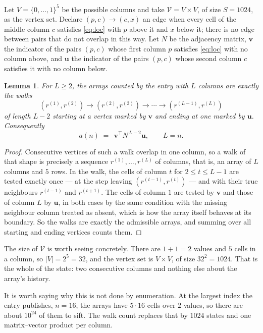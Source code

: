 \documentclass[11pt,a4paper]{article}
\theoremstyle{plain}
\newtheorem{lemma}[theorem]{Lemma}
\theoremstyle{definition}
\begin{document}
Let $V=\{0,\dots,1\}^{5}$ be the possible columns and take
$\mathcal V=V\times V$, of size $S=1024$, as the vertex set. Declare $(p,c)\to(c,x)$ an edge
when every cell of the middle column $c$ satisfies \eqref{eq:loc} with $p$ above it and $x$
below it; there is no edge between pairs that do not overlap in this way. Let $N$ be the
adjacency matrix, $\mathbf{v}$ the indicator of the pairs $(p,c)$ whose first column $p$
satisfies \eqref{eq:loc} with no column above, and $\mathbf{u}$ the indicator of
the pairs $(p,c)$ whose second column $c$ satisfies it with no column below.

\begin{lemma}\label{lem:walk}
For $L\ge2$, the arrays counted by the entry with $L$ columns are exactly the walks
\[
(r^{(1)},r^{(2)})\to(r^{(2)},r^{(3)})\to\cdots\to(r^{(L-1)},r^{(L)})
\]
of length $L-2$ starting at a vertex marked by $\mathbf{v}$ and ending at one marked by
$\mathbf{u}$. Consequently
\[
a(n)\;=\;\,\mathbf{v}^{\!\top}N^{\,L-2}\mathbf{u},\qquad L=n .
\]
\end{lemma}

\begin{proof}
Consecutive vertices of such a walk overlap in one column, so a walk of that shape is
precisely a sequence $r^{(1)},\dots,r^{(L)}$ of columns, that is, an array of $L$ columns
and $5$ rows. In the walk, the cells of column $t$ for $2\le t\le L-1$ are tested
exactly once --- at the step leaving $(r^{(t-1)},r^{(t)})$ --- and with their true
neighbours $r^{(t-1)}$ and $r^{(t+1)}$. The cells of column $1$ are tested by
$\mathbf{v}$ and those of column $L$ by $\mathbf{u}$, in both cases by the same condition
with the missing neighbour column treated as absent, which is how the array itself behaves at
its boundary. So the walks are exactly the admissible arrays, and summing over all starting
and ending vertices counts them.
\end{proof}


The size of $\mathcal V$ is worth seeing concretely. There are $1+1=2$ values
and $5$ cells in a column, so $|V|=2^{5}=32$, and the vertex set is
$V\times V$, of size $32^2=1024$. That is the whole of the state: two consecutive
columns and nothing else about the array's history.

It is worth saying why this is not done by enumeration. At the largest index the entry
publishes, $n=16$, the arrays have $5\cdot16$ cells over
$2$ values, so there are about $10^{24}$ of them to sift. The
walk count replaces that by $1024$ states and one matrix--vector product per column.
\end{document}
